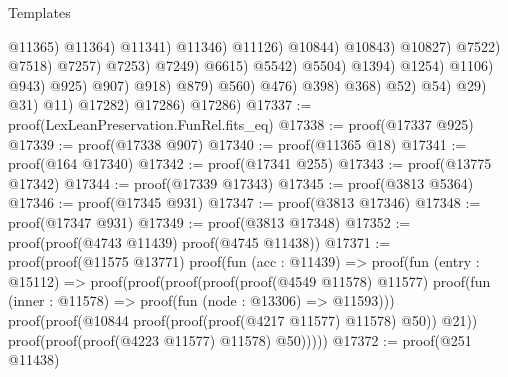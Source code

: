 \begin{lexlean}{Templates}
\begin{coremodule}
                                                                            @11365)
                                                                          @11364)
                                                                        @11341)
                                                                      @11346)
                                                                    @11126)
                                                                  @10844)
                                                                @10843)
                                                              @10827)
                                                            @7522)
                                                          @7518)
                                                        @7257)
                                                      @7253)
                                                    @7249)
                                                  @6615)
                                                @5542)
                                              @5504)
                                            @1394)
                                          @1254)
                                        @1106)
                                      @943)
                                    @925)
                                  @907)
                                @918)
                              @879)
                            @560)
                          @476)
                        @398)
                      @368)
                    @52)
                  @54)
                @29)
              @31)
            @11)
          @17282)
        @17286)
      @17286)
@17337 := proof(LexLeanPreservation.FunRel.fits_eq)
@17338 := proof(@17337 @925)
@17339 := proof(@17338 @907)
@17340 := proof(@11365 @18)
@17341 := proof(@164 @17340)
@17342 := proof(@17341 @255)
@17343 := proof(@13775 @17342)
@17344 := proof(@17339 @17343)
@17345 := proof(@3813 @5364)
@17346 := proof(@17345 @931)
@17347 := proof(@3813 @17346)
@17348 := proof(@17347 @931)
@17349 := proof(@3813 @17348)
@17352 := proof(proof(@4743 @11439) proof(@4745 @11438))
@17371 := proof(proof(@11575 @13771)
      proof(fun (acc : @11439) =>
        proof(fun (entry : @15112) =>
          proof(proof(proof(proof(proof(@4549 @11578) @11577)
                  proof(fun (inner : @11578) => proof(fun (node : @13306) => @11593)))
                proof(proof(@10844 proof(proof(proof(@4217 @11577) @11578) @50)) @21))
              proof(proof(proof(@4223 @11577) @11578) @50)))))
@17372 := proof(@251 @11438)

\end{coremodule}
\end{lexlean}
